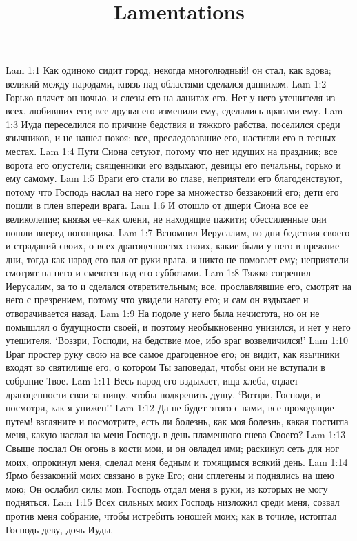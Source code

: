 

\title{Lamentations}

Lam 1:1  Как одиноко сидит город, некогда многолюдный! он стал, как вдова; великий между народами, князь над областями сделался данником.
Lam 1:2  Горько плачет он ночью, и слезы его на ланитах его. Нет у него утешителя из всех, любивших его; все друзья его изменили ему, сделались врагами ему.
Lam 1:3  Иуда переселился по причине бедствия и тяжкого рабства, поселился среди язычников, и не нашел покоя; все, преследовавшие его, настигли его в тесных местах.
Lam 1:4  Пути Сиона сетуют, потому что нет идущих на праздник; все ворота его опустели; священники его вздыхают, девицы его печальны, горько и ему самому.
Lam 1:5  Враги его стали во главе, неприятели его благоденствуют, потому что Господь наслал на него горе за множество беззаконий его; дети его пошли в плен впереди врага.
Lam 1:6  И отошло от дщери Сиона все ее великолепие; князья ее--как олени, не находящие пажити; обессиленные они пошли вперед погонщика.
Lam 1:7  Вспомнил Иерусалим, во дни бедствия своего и страданий своих, о всех драгоценностях своих, какие были у него в прежние дни, тогда как народ его пал от руки врага, и никто не помогает ему; неприятели смотрят на него и смеются над его субботами.
Lam 1:8  Тяжко согрешил Иерусалим, за то и сделался отвратительным; все, прославлявшие его, смотрят на него с презрением, потому что увидели наготу его; и сам он вздыхает и отворачивается назад.
Lam 1:9  На подоле у него была нечистота, но он не помышлял о будущности своей, и поэтому необыкновенно унизился, и нет у него утешителя. `Воззри, Господи, на бедствие мое, ибо враг возвеличился!'
Lam 1:10  Враг простер руку свою на все самое драгоценное его; он видит, как язычники входят во святилище его, о котором Ты заповедал, чтобы они не вступали в собрание Твое.
Lam 1:11  Весь народ его вздыхает, ища хлеба, отдает драгоценности свои за пищу, чтобы подкрепить душу. `Воззри, Господи, и посмотри, как я унижен!'
Lam 1:12  Да не будет этого с вами, все проходящие путем! взгляните и посмотрите, есть ли болезнь, как моя болезнь, какая постигла меня, какую наслал на меня Господь в день пламенного гнева Своего?
Lam 1:13  Свыше послал Он огонь в кости мои, и он овладел ими; раскинул сеть для ног моих, опрокинул меня, сделал меня бедным и томящимся всякий день.
Lam 1:14  Ярмо беззаконий моих связано в руке Его; они сплетены и поднялись на шею мою; Он ослабил силы мои. Господь отдал меня в руки, из которых не могу подняться.
Lam 1:15  Всех сильных моих Господь низложил среди меня, созвал против меня собрание, чтобы истребить юношей моих; как в точиле, истоптал Господь деву, дочь Иуды.
